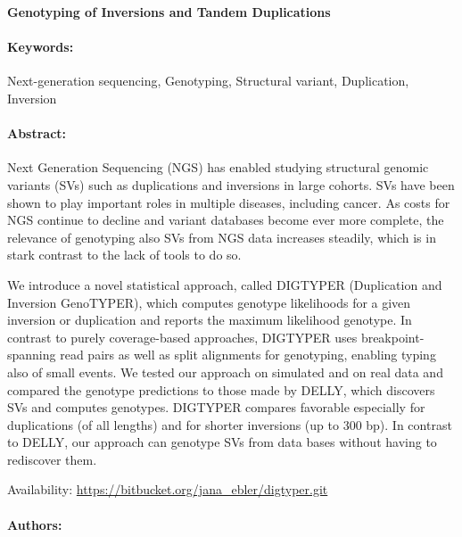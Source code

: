 \documentclass[11pt]{article}
\date{}
\author{}
\begin{document}
\noindent
\large {\bf Genotyping of Inversions and Tandem Duplications} 


\normalsize 


\noindent \paragraph{Keywords:} Next-generation sequencing, Genotyping, Structural variant, Duplication, Inversion

\noindent \paragraph{Abstract:} 

Next Generation Sequencing (NGS) has enabled studying structural genomic variants (SVs)
such as duplications and inversions in large cohorts. SVs have been shown to play important roles in
multiple diseases, including cancer. As costs for NGS continue to decline and variant databases become
ever more complete, the relevance of genotyping also SVs from NGS data increases steadily, which is in
stark contrast to the lack of tools to do so.

We introduce a novel statistical approach, called DIGTYPER (Duplication and Inversion
GenoTYPER), which computes genotype likelihoods for a given inversion or duplication and reports
the maximum likelihood genotype. In contrast to purely coverage-based approaches, DIGTYPER uses
breakpoint-spanning read pairs as well as split alignments for genotyping, enabling typing also of small
events. We tested our approach on simulated and on real data and compared the genotype predictions to
those made by DELLY, which discovers SVs and computes genotypes. DIGTYPER compares favorable
especially for duplications (of all lengths) and for shorter inversions (up to 300 bp). In contrast to DELLY,
our approach can genotype SVs from data bases without having to rediscover them.

Availability: \url{https://bitbucket.org/jana_ebler/digtyper.git}

\noindent \paragraph{Authors:} 

\noindent \paragraph{} 
\end{document}
